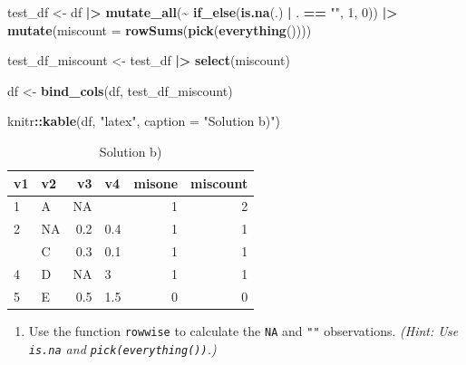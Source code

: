 \documentclass[
  doc]{apa6}
\newenvironment{Shaded}{\begin{snugshade}}{\end{snugshade}}
\newcommand{\AttributeTok}[1]{\textcolor[rgb]{0.13,0.29,0.53}{#1}}
\newcommand{\DecValTok}[1]{\textcolor[rgb]{0.00,0.00,0.81}{#1}}
\newcommand{\FunctionTok}[1]{\textcolor[rgb]{0.13,0.29,0.53}{\textbf{#1}}}
\newcommand{\NormalTok}[1]{#1}
\newcommand{\OtherTok}[1]{\textcolor[rgb]{0.56,0.35,0.01}{#1}}
\newcommand{\SpecialCharTok}[1]{\textcolor[rgb]{0.81,0.36,0.00}{\textbf{#1}}}
\newcommand{\StringTok}[1]{\textcolor[rgb]{0.31,0.60,0.02}{#1}}
\providecommand{\tightlist}{%
  \setlength{\itemsep}{0pt}\setlength{\parskip}{0pt}}
\begin{document}
\newpage

\begin{Shaded}
\begin{Highlighting}[]
\NormalTok{test\_df }\OtherTok{\textless{}{-}}\NormalTok{ df }\SpecialCharTok{|\textgreater{}} 
  \FunctionTok{mutate\_all}\NormalTok{(}\SpecialCharTok{\textasciitilde{}} \FunctionTok{if\_else}\NormalTok{(}\FunctionTok{is.na}\NormalTok{(.) }\SpecialCharTok{|}\NormalTok{ . }\SpecialCharTok{==} \StringTok{""}\NormalTok{, }\DecValTok{1}\NormalTok{, }\DecValTok{0}\NormalTok{)) }\SpecialCharTok{|\textgreater{}}
  \FunctionTok{mutate}\NormalTok{(}\AttributeTok{miscount =} \FunctionTok{rowSums}\NormalTok{(}\FunctionTok{pick}\NormalTok{(}\FunctionTok{everything}\NormalTok{())))}

\NormalTok{test\_df\_miscount }\OtherTok{\textless{}{-}}\NormalTok{ test\_df }\SpecialCharTok{|\textgreater{}} 
  \FunctionTok{select}\NormalTok{(miscount) }
  
\NormalTok{df }\OtherTok{\textless{}{-}} \FunctionTok{bind\_cols}\NormalTok{(df, test\_df\_miscount)}

\NormalTok{knitr}\SpecialCharTok{::}\FunctionTok{kable}\NormalTok{(df, }\StringTok{"latex"}\NormalTok{, }\AttributeTok{caption =} \StringTok{"Solution b)"}\NormalTok{)}
\end{Highlighting}
\end{Shaded}

\begin{table}

\caption{\label{tab:unnamed-chunk-3}Solution b)}
\centering
\begin{tabular}[t]{l|l|r|l|r|r}
\hline
v1 & v2 & v3 & v4 & misone & miscount\\
\hline
1 & A & NA &  & 1 & 2\\
\hline
2 & NA & 0.2 & 0.4 & 1 & 1\\
\hline
 & C & 0.3 & 0.1 & 1 & 1\\
\hline
4 & D & NA & 3 & 1 & 1\\
\hline
5 & E & 0.5 & 1.5 & 0 & 0\\
\hline
\end{tabular}
\end{table}

\newpage

\begin{enumerate}
\def\labelenumi{\alph{enumi})}
\setcounter{enumi}{2}
\tightlist
\item
  Use the function \texttt{rowwise} to calculate the \texttt{NA} and \texttt{""} observations.
  \emph{(Hint: Use \texttt{is.na} and \texttt{pick(everything())}.)}
\end{enumerate}
\end{document}
